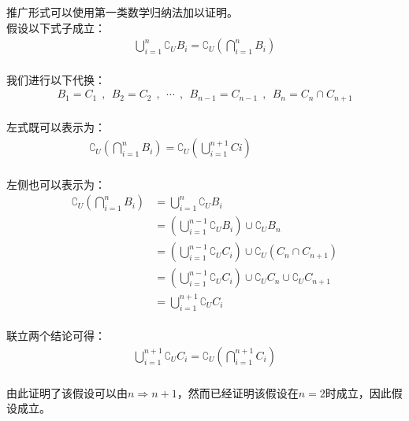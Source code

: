 \documentclass[UTF8]{ctexart}
\begin{document}
\newpage

    推广形式可以使用第一类数学归纳法加以证明。\\[3mm]
    假设以下式子成立：
    \setcounter{equation}{0}
    \begin{align}
        \bigcup_{i=1}^n \complement_UB_i=\complement_U\left(\bigcap_{i=1}^n B_i\right)
    \end{align}\\
    我们进行以下代换：
    \begin{align}
        B_1=C_1~~,~~B_2=C_2~~,~~\cdots~~,~~B_{n-1}=C_{n-1}~~,~~B_n=C_n\cap C_{n+1}
    \end{align}\\
    左式既可以表示为：
    \begin{align}
        \complement_U\left(\bigcap_{i=1}^n B_i\right)=\complement_U\left(\bigcup_{i=1}^{n+1}Ci\right)~~~~~~~~~~~~~~~~~~~~~~~~~~~~
    \end{align}\\
    左侧也可以表示为：
    \begin{align}
        \complement_U\left(\bigcap_{i=1}^n B_i\right)
        &=\bigcup_{i=1}^n\complement_U B_i\\[3mm]
        &=\left(\bigcup_{i=1}^{n-1}\complement_U B_i\right)\cup\complement_U B_n\\[3mm]
        &=\left(\bigcup_{i=1}^{n-1}\complement_U C_i\right)\cup\complement_U\left(C_n\cap C_{n+1}\right)\\[3mm]
        &=\left(\bigcup_{i=1}^{n-1}\complement_U C_i\right)\cup\complement_UC_n\cup \complement_UC_{n+1}\\[3mm]
        &=\bigcup_{i=1}^{n+1}\complement_U C_i
    \end{align}\\
    联立两个结论可得：
    \begin{align}
        \bigcup_{i=1}^{n+1} \complement_UC_i=\complement_U\left(\bigcap_{i=1}^{n+1} C_i\right)
    \end{align}\\
    由此证明了该假设可以由$n\Rightarrow n+1$，然而已经证明该假设在$n=2$时成立，因此假设成立。

\newpage
\end{document}
